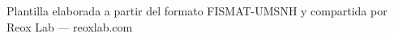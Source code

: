 \begin{acknowledgements}

Plantilla elaborada a partir del formato FISMAT-UMSNH y compartida por Reox Lab --- reoxlab.com
\end{acknowledgements}
